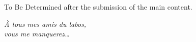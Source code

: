 \documentclass[../Document.tex]{subfiles}
\begin{document}

To Be Determined after the submission of the main content.

\begin{flushright}
  \itshape
  À tous mes amis du labos,\\
  vous me manquerez\ldots
\end{flushright}
\end{document}
